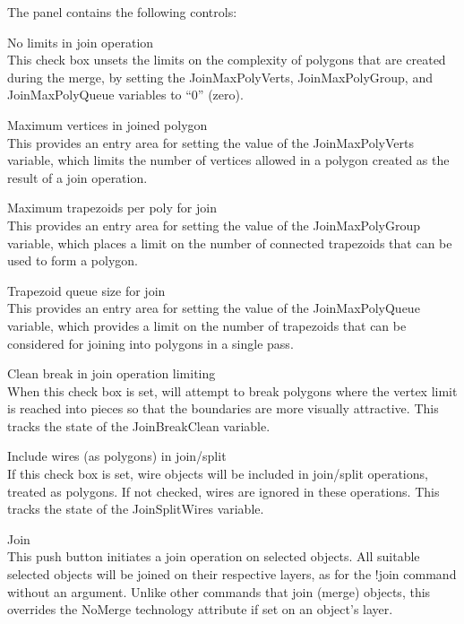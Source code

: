 The panel contains the following controls:
\begin{description}
\item{\cb No limits in join operation}\\
This check box unsets the limits on the complexity of polygons that
are created during the merge, by setting the {\et JoinMaxPolyVerts},
{\et JoinMaxPolyGroup}, and {\et JoinMaxPolyQueue} variables to
``0'' (zero).

\item{\cb Maximum vertices in joined polygon}\\
This provides an entry area for setting the value of the {\et
JoinMaxPolyVerts} variable, which limits the number of vertices
allowed in a polygon created as the result of a join operation.

\item{\cb Maximum trapezoids per poly for join}\\
This provides an entry area for setting the value of the {\et
JoinMaxPolyGroup} variable, which places a limit on the number of
connected trapezoids that can be used to form a polygon.

\item{\cb Trapezoid queue size for join}\\
This provides an entry area for setting the value of the {\et
JoinMaxPolyQueue} variable, which provides a limit on the number of
trapezoids that can be considered for joining into polygons in a
single pass.

\item{\cb Clean break in join operation limiting}\\
When this check box is set, {\Xic} will attempt to break polygons
where the vertex limit is reached into pieces so that the boundaries
are more visually attractive.  This tracks the state of the {\et
JoinBreakClean} variable.

\item{\cb Include wires (as polygons) in join/split}\\
If this check box is set, wire objects will be included in join/split
operations, treated as polygons.  If not checked, wires are ignored in
these operations.  This tracks the state of the {\et JoinSplitWires}
variable.

\item{\cb Join}\\
This push button initiates a join operation on selected objects.  All
suitable selected objects will be joined on their respective layers,
as for the {\cb !join} command without an argument.  Unlike other
commands that join (merge) objects, this overrides the {\vt NoMerge}
technology attribute if set on an object's layer.


\end{description}

